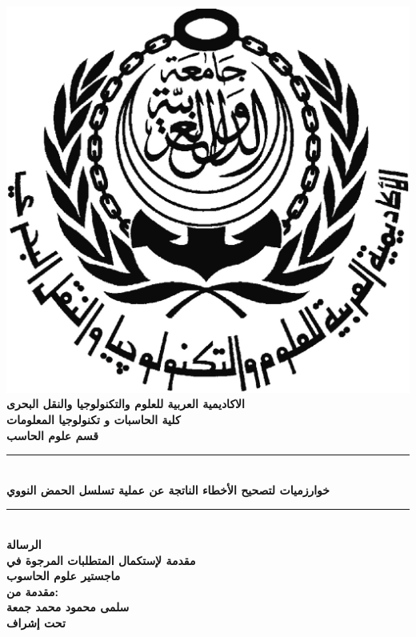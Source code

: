 \documentclass{llncs}
\newcommand{\HRule}{\rule{\linewidth}{0.5mm}} %
\begin{document}
\begin{titlepage}
\center %
\includegraphics[scale=0.2]{./figs/aast}\\[0.7cm]
{\Large \bfseries 
الاكاديمية العربية للعلوم والتكنولوجيا والنقل البحرى
}\\[0.6cm]
{\large \bfseries 
كلية الحاسبات و تكنولوجيا المعلومات
}\\[0.3cm]
{\large \bfseries 
قسم علوم الحاسب
}\\[0.3cm] 
\HRule \\[0.3cm]
{\LARGE \bfseries 
خوارزميات لتصحيح الأخطاء الناتجة عن عملية تسلسل الحمض النووي
}\\[0.3cm]
\HRule \\[0.7cm]
{\large \bfseries 
الرسالة
}\\[0.3cm]
{\large \bfseries
مقدمة لإستكمال المتطلبات المرجوة في
}\\[0.3cm]
{\Large \bfseries
 ماجستير علوم الحاسوب 
}\\[0.5cm]
{\large \bfseries 
مقدمة من:
}\\[0.3cm]
{\Large \bfseries
سلمى محمود محمد جمعة
}\\[0.5cm]
{\large \bfseries 
تحت إشراف
}\\[0.7cm]
\begin{minipage}{0.45\textwidth}
\begin{flushleft}
\center

\end{flushleft}
\end{minipage}
\end{titlepage}
\end{document}
